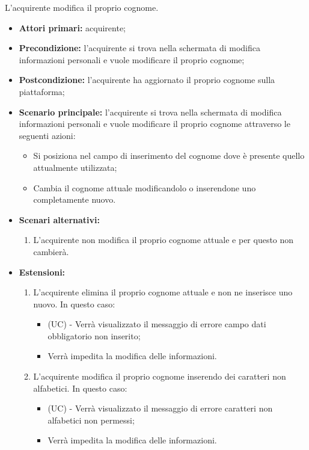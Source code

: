 L'acquirente modifica il proprio cognome.
\begin{itemize}
    \item \textbf{Attori primari:} acquirente;
    \item \textbf{Precondizione:} l'acquirente si trova nella schermata di modifica informazioni personali e vuole modificare il proprio cognome;
    \item \textbf{Postcondizione:} l'acquirente ha aggiornato il proprio cognome sulla piattaforma;
    \item \textbf{Scenario principale:} l'acquirente si trova nella schermata di modifica informazioni personali e vuole modificare il proprio cognome attraverso le seguenti azioni:
        \begin{itemize}
            \item Si posiziona nel campo di inserimento del cognome dove è presente quello attualmente utilizzata;
            \item Cambia il cognome attuale modificandolo o inserendone uno completamente nuovo.
        \end{itemize}
    \item \textbf{Scenari alternativi:} 
    \begin{enumerate}[label=\lett]
        \item L'acquirente non modifica il proprio cognome attuale e per questo non cambierà.
    \end{enumerate}
    \item \textbf{Estensioni:} 
    \begin{enumerate}[label=\lett]
        \item L'acquirente elimina il proprio cognome attuale e non ne inserisce uno nuovo. In questo caso:
        \begin{itemize}
            \item (UC) - Verrà visualizzato il messaggio di errore campo dati obbligatorio non inserito;
            \item Verrà impedita la modifica delle informazioni.
        \end{itemize}
        \item L'acquirente modifica il proprio cognome inserendo dei caratteri non alfabetici. In questo caso:
        \begin{itemize}
            \item (UC) - Verrà visualizzato il messaggio di errore caratteri non alfabetici non permessi;
            \item Verrà impedita la modifica delle informazioni.
        \end{itemize}
    \end{enumerate}
\end{itemize}

